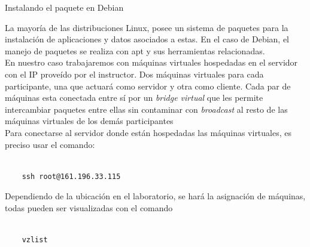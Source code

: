 \begin{frame}{Instalando el paquete en Debian}

    La mayoría de las distribuciones Linux, posee un sistema de paquetes para
    la instalación de aplicaciones y datos asociados a estas. En el caso de
    Debian, el manejo de paquetes se realiza con apt y sus herramientas
    relacionadas.\\[0.2cm]

    En nuestro caso trabajaremos con máquinas virtuales hospedadas en el
    servidor con el IP proveído por el instructor. Dos máquinas virtuales para
    cada participante, una que actuará como servidor y otra como
    cliente. Cada par de máquinas esta conectada entre sí por un
    \textit{bridge virtual} que les permite intercambiar paquetes entre ellas
    sin contaminar con \textit{broadcast} al resto de las máquinas virtuales de
    los demás participantes\\[0.2cm] 

    Para conectarse al servidor donde están hospedadas las máquinas virtuales,
    es preciso usar el comando:

\begin{verbatim}

    ssh root@161.196.33.115

\end{verbatim} 

    Dependiendo de la ubicación en el laboratorio, se hará la asignación de
    máquinas, todas pueden ser visualizadas con el comando

\begin{verbatim}

    vzlist

\end{verbatim} 


\end{frame}


